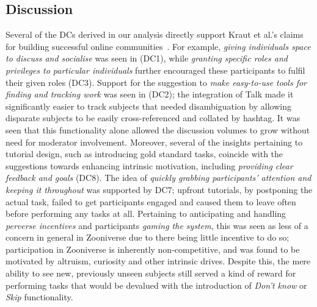 \documentclass{sigchi}
\begin{document}
\begin{spacing}{0.97}
\section{Discussion}

Several of the DCs derived in our analysis directly support Kraut et al.'s claims for building successful online communities~\cite{kraut2012building}. For example, \emph{giving individuals space to discuss and socialise} was seen in (DC1), while \emph{granting specific roles and privileges to particular individuals} further encouraged these participants to fulfil their given roles (DC3). Support for the suggestion to \emph{make easy-to-use tools for finding and tracking work} was seen in (DC2); the integration of Talk made it significantly easier to track subjects that needed disambiguation by allowing disparate subjects to be easily cross-referenced and collated by hashtag. It was seen that this functionality alone allowed the discussion volumes to grow without need for moderator involvement. Moreover, several of the insights pertaining to tutorial design, such as introducing gold standard tasks, coincide with the suggestions towards enhancing intrinsic motivation, including \emph{providing clear feedback and goals} (DC8). The idea of \emph{quickly grabbing participants' attention and keeping it throughout} was supported by DC7; upfront tutorials, by postponing the actual task, failed to get participants engaged and caused them to leave often before performing any tasks at all. Pertaining to anticipating and handling \emph{perverse incentives} and participants \emph{gaming the system}, this was seen as less of a concern in general in Zooniverse due to there being little incentive to do so; participation in Zooniverse is inherently non-competitive, and was found to be motivated by altruism, curiosity and other intrinsic drives. Despite this, the mere ability to see new, previously unseen subjects still served a kind of reward for performing tasks that would be devalued with the introduction of \emph{Don't know} or \emph{Skip} functionality. %


\end{spacing}
\end{document}
